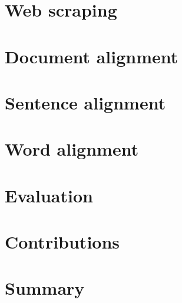 




\tableofcontents

\chapter{Web scraping}
\chapter{Document alignment}
\chapter{Sentence alignment}
\chapter{Word alignment}

\chapter{Evaluation}
\chapter{Contributions}
\chapter{Summary}

%
\printbibliography
